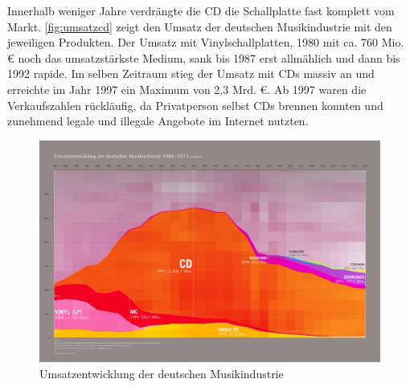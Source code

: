 Innerhalb weniger Jahre verdrängte die CD die Schallplatte fast komplett vom
Markt. \autoref{fig:umsatzcd} zeigt den Umsatz der deutschen Musikindustrie mit
den jeweiligen Produkten. Der Umsatz mit Vinylschallplatten, 1980 mit ca. 760
Mio. \euro{} noch das umsatzstärkste Medium, sank bis 1987 erst all­mäh­lich und
dann bis 1992 rapide. Im selben Zeitraum stieg der Umsatz mit CDs massiv an und
erreichte im Jahr 1997 ein Maximum von 2,3 Mrd. \euro. Ab 1997 waren die
Verkaufszahlen rückläufig, da Privatperson selbst CDs \glqq brennen\grqq{}
konnten und zunehmend legale und illegale Angebote im Internet nutzten.

\begin{figure}[h]
    \begin{center}
        \begin{minipage}[t]{\textwidth}
            \begin{center}
                \includegraphics[width=\textwidth]{Bilder/Optische_Datentraeger_Die_Compact_Disc/Geschichte/cdumsatz.png}
                \caption[Umsatzentwicklung der deutschen Musikindustrie \newline \url{http://www.musikindustrie.de/uploads/media/140325\_BVMI\_2013\_Jahrbuch\_ePaper\_V02.pdf} S.7 (zuletzt aufgerufen am 03.08.2015)]{Umsatzentwicklung der deutschen Musikindustrie}
                \label{fig:umsatzcd}
            \end{center}
        \end{minipage}
    \end{center}
\end{figure}
